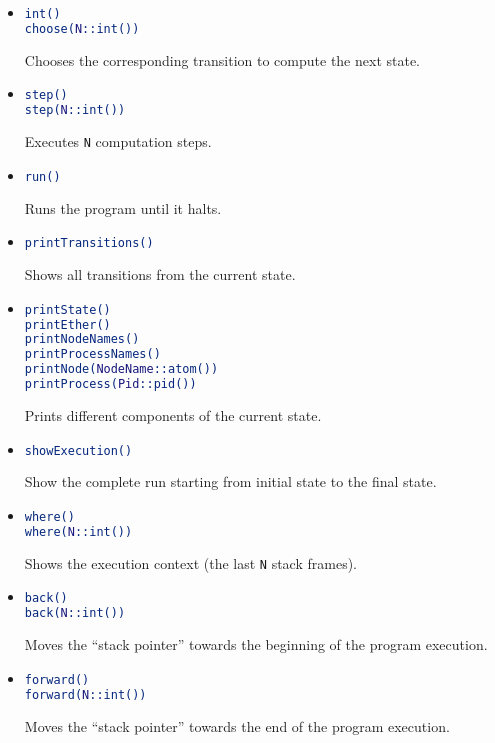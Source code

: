 \documentclass[a4paper]{article}
\begin{document}
\begin{itemize}
\item
\begin{lstlisting}[language=Erlang]
int()
choose(N::int())
\end{lstlisting}
Chooses the corresponding
transition to compute the next state.

\item
\begin{lstlisting}[language=Erlang]
step()
step(N::int())
\end{lstlisting}
Executes \lstinline{N} computation steps.

\item
\begin{lstlisting}[language=Erlang]
run()
\end{lstlisting}
Runs the program until it halts.

\item
\begin{lstlisting}[language=Erlang]
printTransitions()
\end{lstlisting}  
Shows all transitions from the current state.

\item
\begin{lstlisting}[language=Erlang]
printState()
printEther()
printNodeNames()
printProcessNames()
printNode(NodeName::atom())
printProcess(Pid::pid())
\end{lstlisting} 
Prints different components of
the current state.

\item
\begin{lstlisting}[language=Erlang]
showExecution()
\end{lstlisting}  
Show the complete run starting from initial state to the final state.

\item
\begin{lstlisting}[language=Erlang]
where()
where(N::int())
\end{lstlisting}
Shows the execution context (the last \lstinline{N} stack frames).

\item
\begin{lstlisting}[language=Erlang]
back()
back(N::int())
\end{lstlisting}
Moves the ``stack pointer'' towards the beginning of the program execution.

\item
\begin{lstlisting}[language=Erlang]
forward()
forward(N::int())
\end{lstlisting} 
Moves the ``stack pointer'' towards the end of the program execution.


\end{itemize}
\end{document}
